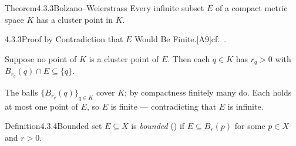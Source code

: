 \documentclass[main.tex]{subfiles}
\begin{document}
\begin{Obj}{Theorem}{4.3.3}{Bolzano--Weierstrass}
Every infinite subset $E$ of a compact metric space $K$ has a cluster point in $K$.
\end{Obj}
\begin{Prf}{4.3.3}{Proof by Contradiction that $E$ Would Be Finite.}{[A9]\quad cf.\ .}
\item Suppose no point of $K$ is a cluster point of $E$. Then each $q\in K$ has $r_q>0$ with
  $B_{r_q}(q)\cap E\subseteq\{q\}$.
\item The balls $\{B_{r_q}(q)\}_{q\in K}$ cover $K$; by compactness finitely many do. Each holds at
  most one point of $E$, so $E$ is finite --- contradicting that $E$ is infinite.
\end{Prf}

\begin{Obj}{Definition}{4.3.4}{Bounded set}
$E\subseteq X$ is \emph{bounded} () if $E\subseteq B_r(p)$ for some $p\in X$ and $r>0$.
\end{Obj}
\end{document}
